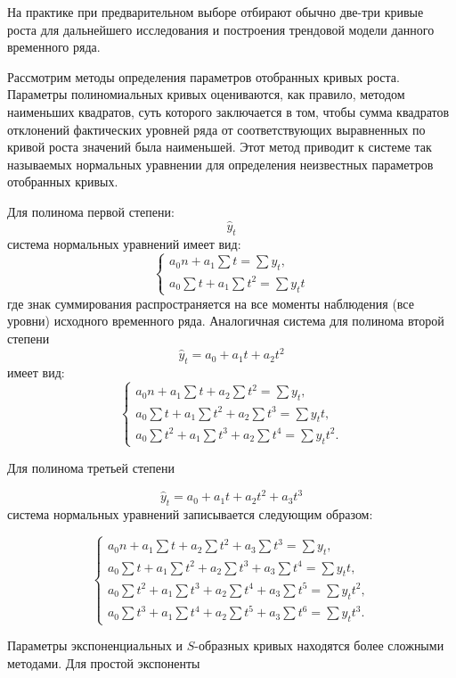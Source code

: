 На практике при предварительном выборе отбирают обычно две-три кривые роста для дальнейшего исследования и построения трендовой модели данного временного ряда.

Рассмотрим методы определения параметров отобранных кривых роста. Параметры полиномиальных кривых оцениваются, как правило, методом наименьших квадратов, суть которого заключается в том, чтобы сумма квадратов отклонений фактических уровней ряда от соответствующих выравненных по кривой роста значений была наименьшей. Этот метод приводит к системе так называемых нормальных уравнении для определения неизвестных параметров отобранных кривых.

Для полинома первой степени:
\[ \hat{y}_t \]
система нормальных уравнений имеет вид:
\[ 
	\left\{
			\begin{array}{ll}
										a_0n + a_1\sum t = \sum y_t,  \\ 
										a_0\sum t + a_1\sum t^2 = \sum y_tt 
			\end{array} \right. \]
где знак суммирования распространяется на все моменты наблюдения (все уровни) исходного временного ряда. Аналогичная система для полинома второй степени
\[ \hat{y}_t = a_0 + a_1t +a_2t^2  \]
имеет вид:
\[ 
	\left\{
		\begin{array}{ll}
				a_0n + a_1\sum t +a_2 \sum t^2 = \sum y_t, \\ 
				a_0\sum t + a_1\sum t^2 + a_2 \sum t^3 = \sum y_tt, \\
				a_0 \sum t^2 + a_1\sum t^3 + a_2 \sum t^4 = \sum y_t t^2.
		\end{array} \right. 
\]

Для полинома третьей степени

\[ \hat{y}_t = a_0 + a_1t +a_2t^2 + a_3t^3 \]
система нормальных уравнений записывается следующим образом:

\[ 
	\left\{
		\begin{array}{ll}
			a_0n + a_1\sum t +a_2 \sum t^2 + a_3\sum t^3 = \sum y_t, \\ 
			a_0\sum t + a_1\sum t^2 + a_2 \sum t^3 + a_3\sum t^4= \sum y_tt, \\
			a_0 \sum t^2 + a_1\sum t^3 + a_2 \sum t^4 + a_3\sum t^5 = \sum y_t t^2, \\
			a_0 \sum t^3 + a_1\sum t^4 + a_2 \sum t^5 + a_3\sum t^6= \sum y_t t^3.
		\end{array}\right. 
\]

Параметры экспоненциальных и $S$-образных кривых находятся более сложными методами. Для простой экспоненты

